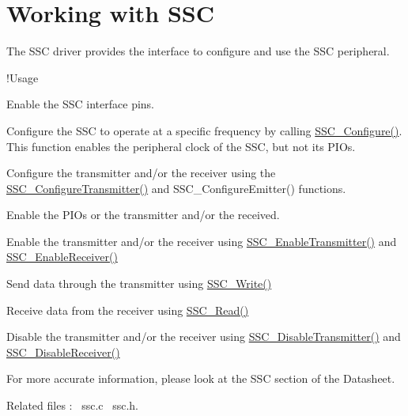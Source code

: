 \hypertarget{group__ssc__module}{}\section{Working with S\+SC}
\label{group__ssc__module}
The S\+SC driver provides the interface to configure and use the S\+SC peripheral.

!\+Usage


\begin{DoxyEnumerate}
\item Enable the S\+SC interface pins.
\item Configure the S\+SC to operate at a specific frequency by calling \mbox{\hyperlink{ssc_8c_a936155ced242aad2850d1e341c80b9c1}{S\+S\+C\+\_\+\+Configure()}}. This function enables the peripheral clock of the S\+SC, but not its P\+I\+Os.
\item Configure the transmitter and/or the receiver using the \mbox{\hyperlink{ssc_8c_a57442f32d1ef6e59f8d337919bcc414a}{S\+S\+C\+\_\+\+Configure\+Transmitter()}} and S\+S\+C\+\_\+\+Configure\+Emitter() functions.
\item Enable the P\+I\+Os or the transmitter and/or the received.
\item Enable the transmitter and/or the receiver using \mbox{\hyperlink{ssc_8c_a5a740750d38837ddcc763d354c3c051e}{S\+S\+C\+\_\+\+Enable\+Transmitter()}} and \mbox{\hyperlink{ssc_8c_a92c4ee1c26ada76c827eee0479817faf}{S\+S\+C\+\_\+\+Enable\+Receiver()}}
\item Send data through the transmitter using \mbox{\hyperlink{ssc_8c_a6c8765a16feea4278c1fbee27dabe76c}{S\+S\+C\+\_\+\+Write()}}
\item Receive data from the receiver using \mbox{\hyperlink{ssc_8c_a690b5b0177c3d1ea85b8f8dd8b2c7c00}{S\+S\+C\+\_\+\+Read()}}
\item Disable the transmitter and/or the receiver using \mbox{\hyperlink{ssc_8c_aff6d41354eef0fb13cc9ec84e28b5783}{S\+S\+C\+\_\+\+Disable\+Transmitter()}} and \mbox{\hyperlink{ssc_8c_af450f09455a60e039542bcc974d5e74f}{S\+S\+C\+\_\+\+Disable\+Receiver()}}
\end{DoxyEnumerate}

For more accurate information, please look at the S\+SC section of the Datasheet.

Related files \+:~\newline
ssc.\+c~\newline
 ssc.\+h.~\newline
 
